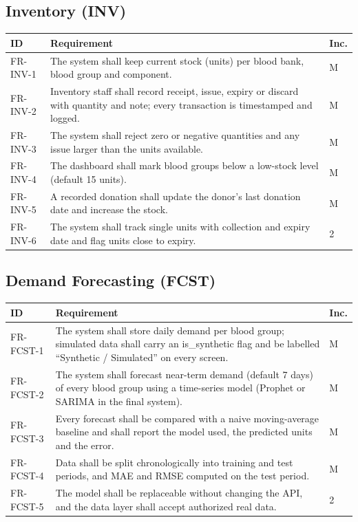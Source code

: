 \documentclass{scrreprt}
\begin{document}
\subsection*{Inventory (INV)}
\begin{longtable}{@{}l L{11.6cm} l@{}}
\toprule
\textbf{ID} & \textbf{Requirement} & \textbf{Inc.}\\
\midrule
\endhead
FR-INV-1 & The system shall keep current stock (units) per blood bank, blood group and component. & M\\
FR-INV-2 & Inventory staff shall record receipt, issue, expiry or discard with quantity and note; every transaction is timestamped and logged. & M\\
FR-INV-3 & The system shall reject zero or negative quantities and any issue larger than the units available. & M\\
FR-INV-4 & The dashboard shall mark blood groups below a low-stock level (default 15 units). & M\\
FR-INV-5 & A recorded donation shall update the donor's last donation date and increase the stock. & M\\
FR-INV-6 & The system shall track single units with collection and expiry date and flag units close to expiry. & 2\\
\bottomrule
\end{longtable}

\subsection*{Demand Forecasting (FCST)}
\begin{longtable}{@{}l L{11.6cm} l@{}}
\toprule
\textbf{ID} & \textbf{Requirement} & \textbf{Inc.}\\
\midrule
\endhead
FR-FCST-1 & The system shall store daily demand per blood group; simulated data shall carry an is\_synthetic flag and be labelled ``Synthetic / Simulated'' on every screen. & M\\
FR-FCST-2 & The system shall forecast near-term demand (default 7 days) of every blood group using a time-series model (Prophet or SARIMA in the final system). & M\\
FR-FCST-3 & Every forecast shall be compared with a naive moving-average baseline and shall report the model used, the predicted units and the error. & M\\
FR-FCST-4 & Data shall be split chronologically into training and test periods, and MAE and RMSE computed on the test period. & M\\
FR-FCST-5 & The model shall be replaceable without changing the API, and the data layer shall accept authorized real data. & 2\\
\bottomrule
\end{longtable}
\end{document}
